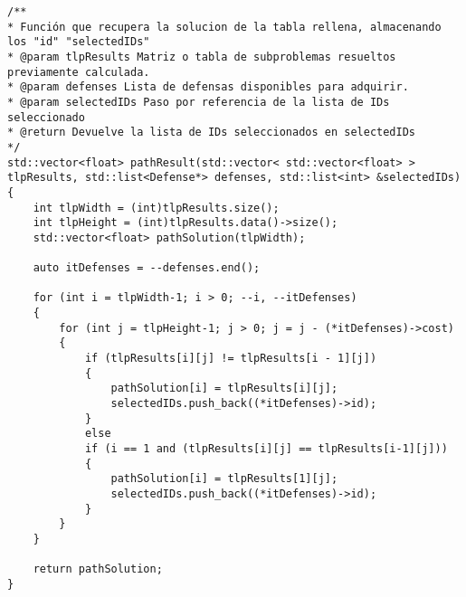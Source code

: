 \begin{lstlisting}
/**
* Función que recupera la solucion de la tabla rellena, almacenando los "id" "selectedIDs"
* @param tlpResults Matriz o tabla de subproblemas resueltos previamente calculada.
* @param defenses Lista de defensas disponibles para adquirir.
* @param selectedIDs Paso por referencia de la lista de IDs seleccionado
* @return Devuelve la lista de IDs seleccionados en selectedIDs
*/
std::vector<float> pathResult(std::vector< std::vector<float> > tlpResults, std::list<Defense*> defenses, std::list<int> &selectedIDs)
{
	int tlpWidth = (int)tlpResults.size();
	int tlpHeight = (int)tlpResults.data()->size();
	std::vector<float> pathSolution(tlpWidth);
	
	auto itDefenses = --defenses.end();
	
	for (int i = tlpWidth-1; i > 0; --i, --itDefenses)
	{
		for (int j = tlpHeight-1; j > 0; j = j - (*itDefenses)->cost)
		{
			if (tlpResults[i][j] != tlpResults[i - 1][j])
			{
				pathSolution[i] = tlpResults[i][j];
				selectedIDs.push_back((*itDefenses)->id);
			}
			else
			if (i == 1 and (tlpResults[i][j] == tlpResults[i-1][j]))
			{
				pathSolution[i] = tlpResults[1][j];
				selectedIDs.push_back((*itDefenses)->id);
			}
		}
	}

	return pathSolution;
}
\end{lstlisting}